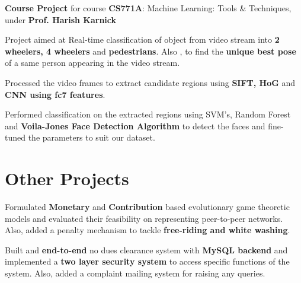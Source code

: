 \documentclass[a4paper]{norm-resume}
\begin{document}
	\vspace{2mm}
	\vspace{0.45mm}
	\begin{tightitemize}
	\small
	{
	\item \textbf{Course Project} for course \textbf{CS771A}: Machine Learning: Tools \& Techniques, under \textbf{Prof. Harish Karnick}
	\item Project aimed at Real-time classification of object from video stream into \textbf{2 wheelers, 4 wheelers} and \textbf{pedestrians}. Also , to
    find the \textbf{unique best pose} of a same person appearing in the video stream.
    \item Processed the video frames to extract candidate regions using \textbf{SIFT, HoG }and \textbf{CNN using fc7 features}.
    \item Performed classification on the extracted regions using SVM’s, Random Forest and \textbf{Voila-Jones Face Detection Algorithm} to
    detect the faces and fine-tuned the parameters to suit our dataset.
    }
	\end{tightitemize}



\section{Other Projects}
           
    \vspace{0.45mm}
    \begin{tightitemize}
	\small
	{
	\item Formulated \textbf{Monetary} and \textbf{Contribution} based evolutionary game theoretic models and evaluated their feasibility on representing peer-to-peer networks. Also, added a penalty mechanism to tackle \textbf{free-riding and white washing}. 
    }
	\end{tightitemize}
	
	\vspace{2mm}
    
           
    \vspace{0.45mm}
    \begin{tightitemize}
	\small
	{
	\item Built and \textbf{end-to-end} no dues clearance system with \textbf{MySQL backend} and implemented a \textbf{two layer security system} to access specific functions of the system. Also, added a complaint mailing system for raising any queries.
    }
	\end{tightitemize}
    
\end{document}
